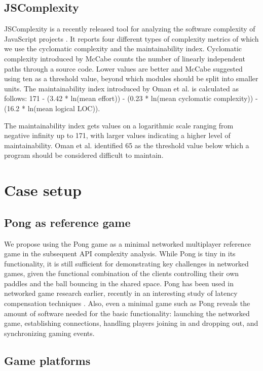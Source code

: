 \documentclass[conference]{IEEEtran}
\begin{document}
\subsection{JSComplexity}

JSComplexity is a recently released tool for analyzing the software
complexity of JavaScript projects \cite{jscomplexity}. It reports four
different types of complexity metrics of which we use the cyclomatic
complexity and the maintainability index.  Cyclomatic complexity
introduced by McCabe \cite{mccabe} counts the number of linearly
independent paths through a source code. Lower values are better and
McCabe suggested using ten as a threshold value, beyond which modules
should be split into smaller units.  The maintainability index
introduced by Oman et al. \cite{oman} is calculated as follows: 171 -
(3.42 * ln(mean effort)) - (0.23 * ln(mean cyclomatic complexity)) -
(16.2 * ln(mean logical LOC)).

The maintainability index gets values on a logarithmic scale ranging
from negative infinity up to 171, with larger values indicating a
higher level of maintainability. Oman et al. identified 65 as the
threshold value below which a program should be considered difficult
to maintain.

\section{Case setup}

\subsection{Pong as reference game}

We propose using the Pong game as a minimal networked multiplayer
reference game in the subsequent API complexity analysis. While Pong
is tiny in its functionality, it is still sufficient for demonstrating
key challenges in networked games, given the functional combination of
the clients controlling their own paddles and the ball bouncing in the
shared space. Pong has been used in networked game research earlier,
recently in an interesting study of latency compensation techniques
\cite{pong-ping}. Also, even a minimal game such as Pong reveals the
amount of software needed for the basic functionality: launching the
networked game, establishing connections, handling players joining in
and dropping out, and synchronizing gaming events.

\subsection{Game platforms}
\end{document}
